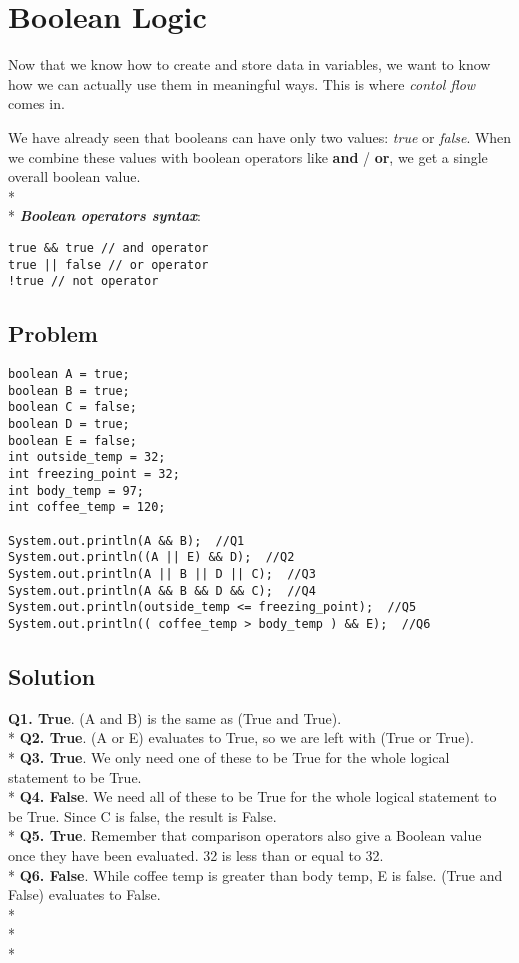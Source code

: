 \documentclass[14pt]{extreport}%
\begin{document}
\section*{Boolean Logic }
Now that we know how to create and store data in variables, we want to know how we can actually use them in meaningful ways. This is where \textit{contol flow} comes in.

We have already seen that booleans can have only two values: \textit{true} or \textit{false}. When we combine these values with boolean operators like \textbf{and} / \textbf{or}, we get a single overall boolean value. \\* \\*
\textbf{\textit{Boolean operators syntax}}: 
\begin{lstlisting}
true && true // and operator
true || false // or operator
!true // not operator
\end{lstlisting}

\subsection*{Problem}
\begin{lstlisting}
boolean A = true;
boolean B = true;
boolean C = false;
boolean D = true;
boolean E = false;
int outside_temp = 32;
int freezing_point = 32;
int body_temp = 97;
int coffee_temp = 120;

System.out.println(A && B);  //Q1
System.out.println((A || E) && D);  //Q2
System.out.println(A || B || D || C);  //Q3
System.out.println(A && B && D && C);  //Q4
System.out.println(outside_temp <= freezing_point);  //Q5
System.out.println(( coffee_temp > body_temp ) && E);  //Q6
\end{lstlisting}

\subsection*{Solution}
\textbf{Q1. True}. (A and B) is the same as (True and True). \\*
\textbf{Q2. True}. (A or E) evaluates to True, so we are left with (True or True). \\*
\textbf{Q3. True}. We only need one of these to be True for the whole logical statement to be True. \\*
\textbf{Q4. False}. We need all of these to be True for the whole logical statement to be True. Since C is false, the result is False. \\*
\textbf{Q5. True}. Remember that comparison operators also give a Boolean value
once they have been evaluated. 32 is less than or equal to 32. \\*
\textbf{Q6. False}. While coffee temp is greater than body temp, E is false. (True
and False) evaluates to False. \\* \\* \\*
\end{document}
